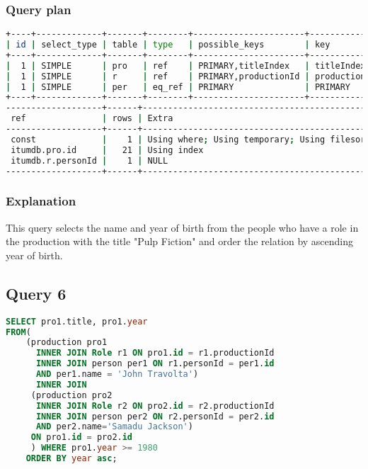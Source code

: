 \subsubsection{Query plan}
\begin{lstlisting}[language=bash]
+----+-------------+-------+--------+----------------------+--------------+---------+
| id | select_type | table | type   | possible_keys        | key          | key_len |
+----+-------------+-------+--------+----------------------+--------------+---------+
|  1 | SIMPLE      | pro   | ref    | PRIMARY,titleIndex   | titleIndex   | 32      |
|  1 | SIMPLE      | r     | ref    | PRIMARY,productionId | productionId | 4       |
|  1 | SIMPLE      | per   | eq_ref | PRIMARY              | PRIMARY      | 4       |
+----+-------------+-------+--------+----------------------+--------------+---------+
-------------------+------+----------------------------------------------+
 ref               | rows | Extra                                        |
-------------------+------+----------------------------------------------+
 const             |    1 | Using where; Using temporary; Using filesort |
 itumdb.pro.id     |   21 | Using index                                  |
 itumdb.r.personId |    1 | NULL                                         |
-------------------+------+----------------------------------------------+
\end{lstlisting}

\subsubsection{Explanation}
This query selects the name and year of birth from the people who have a role in the production with the title "Pulp Fiction" and order the relation by ascending year of birth.


\bigskip
\subsection{Query 6}
\begin{lstlisting}[language=sql]
SELECT pro1.title, pro1.year
FROM(
	(production pro1
	  INNER JOIN Role r1 ON pro1.id = r1.productionId
	  INNER JOIN person per1 ON r1.personId = per1.id
	  AND per1.name = 'John Travolta')
	  INNER JOIN
	 (production pro2
	  INNER JOIN Role r2 ON pro2.id = r2.productionId
	  INNER JOIN person per2 ON r2.personId = per2.id
	  AND per2.name='Samadu Jackson') 
	 ON pro1.id = pro2.id
	 ) WHERE pro1.year >= 1980
	ORDER BY year asc;
\end{lstlisting}

